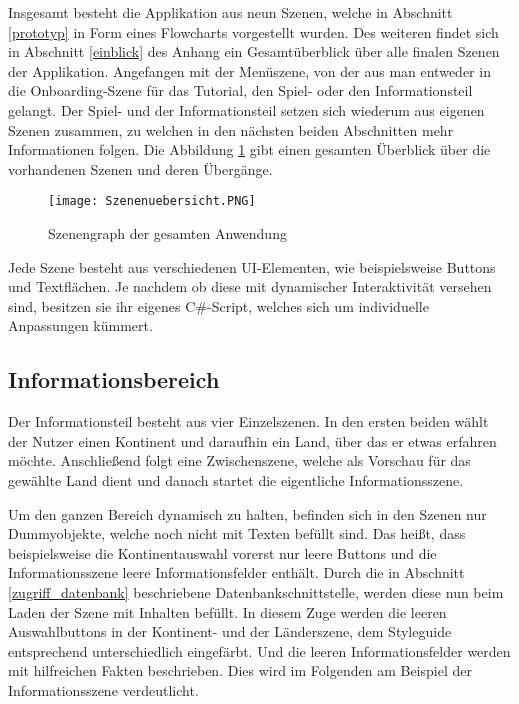 Insgesamt besteht die Applikation aus neun Szenen, welche in Abschnitt \ref{prototyp} in Form eines Flowcharts vorgestellt wurden.
Des weiteren findet sich in Abschnitt \ref{einblick} des Anhang ein Gesamtüberblick über alle finalen Szenen der Applikation.
Angefangen mit der Menüszene, von der aus man entweder in die Onboarding-Szene für das Tutorial, den Spiel- oder den Informationsteil gelangt. 
Der Spiel- und der Informationsteil setzen sich wiederum aus eigenen Szenen zusammen, zu welchen in den nächsten beiden Abschnitten mehr Informationen folgen. 
Die Abbildung \ref{fig:scenegraph} gibt einen gesamten Überblick über die vorhandenen Szenen und deren Übergänge.

\begin{figure} [h]
\centering
\texttt{[image: Szenenuebersicht.PNG]}
\caption{Szenengraph der gesamten Anwendung}
\label{fig:scenegraph}
\end{figure}

Jede Szene besteht aus verschiedenen UI-Elementen, wie beispielsweise Buttons und Textflächen. Je nachdem ob diese mit dynamischer Interaktivität versehen sind, besitzen sie ihr eigenes C\#-Script, welches sich um individuelle Anpassungen kümmert.

\subsection{Informationsbereich}
Der Informationsteil besteht aus vier Einzelszenen. 
In den ersten beiden wählt der Nutzer einen Kontinent und daraufhin ein Land, über das er etwas erfahren möchte.
Anschließend folgt eine Zwischenszene, welche als Vorschau für das gewählte Land dient und danach startet die eigentliche Informationsszene. 

Um den ganzen Bereich dynamisch zu halten, befinden sich in den Szenen nur Dummyobjekte, welche noch nicht mit Texten befüllt sind. Das heißt, dass beispielsweise die Kontinentauswahl vorerst nur leere Buttons und die Informationsszene leere Informationsfelder enthält.
Durch die in Abschnitt \ref{zugriff_datenbank} beschriebene Datenbankschnittstelle, werden diese nun beim Laden der Szene mit Inhalten befüllt. 
In diesem Zuge werden die leeren Auswahlbuttons in der Kontinent- und der Länderszene, dem Styleguide entsprechend unterschiedlich eingefärbt. Und die leeren Informationsfelder werden mit hilfreichen Fakten beschrieben.
Dies wird im Folgenden am Beispiel der Informationsszene verdeutlicht.


